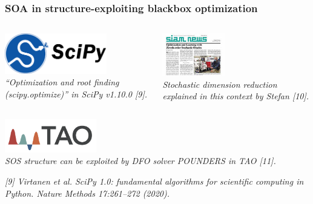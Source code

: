 \documentclass[aspectratio=169]{beamer}
\begin{document}
\begin{frame}\frametitle{SOA in structure-exploiting blackbox optimization}
\begin{columns}
\begin{column}{0.5\textwidth}
\begin{center}
\includegraphics[width=0.7\textwidth]{../img/logos/logo-scipy.png}\\
{\tiny \sl
``Optimization and root finding (scipy.optimize)'' in SciPy v1.10.0 [9].\\
}
\end{center}
\end{column}
\begin{column}{0.5\textwidth}
\begin{center}
\includegraphics[height=5em]{../img/probs/siam_news_feb_23.jpg}\\
{\tiny \sl
Stochastic dimension reduction explained in this context
by Stefan [10].\\
}
\end{center}
\end{column}
\end{columns}

\bigskip

\begin{center}
\includegraphics[width=0.3\textwidth]{../img/logos/logo-tao.png}\\
{\tiny \sl
SOS structure can be exploited by DFO solver POUNDERS in TAO [11].\\
}
\end{center}

\vfill

{\tiny\it
[9] Virtanen et al.
SciPy 1.0: fundamental algorithms for scientific computing in Python.
{\sl Nature Methods 17:261--272 (2020).}\\
}


\end{frame}
\end{document}
